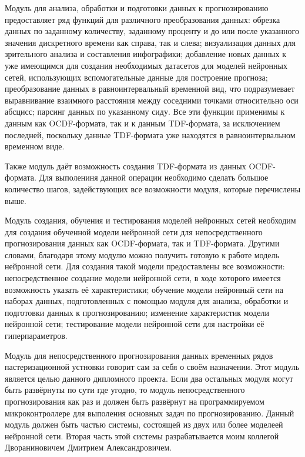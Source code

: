 {    \par \redline Модуль для анализа, обработки и подготовки данных к прогнозированию предоставляет ряд функций для различного преобразования данных: обрезка данных по заданному количеству, заданному проценту и до или после указанного значения дискретного времени как справа, так и слева; визуализация данных для зрительного анализа и составления инфографики; добавление новых данных к уже имеющимся для создания необходимых датасетов для моделей нейронных сетей, использующих вспомогательные данные для построение прогноза; преобразование данных в равноинтервальный временной вид, что подразумевает выравнивание взаимного расстояния между соседними точками относительно оси абсцисс; парсинг данных по указанному сиду. Все эти функции применимы к данным как OCDF-формата, так и к данным TDF-формата, за исключением последней, поскольку данные TDF-формата уже находятся в равноинтервальном временном виде.

    \par \redline Также модуль даёт возможность создания TDF-формата из данных OCDF-формата. Для выполениня данной операции необходимо сделать большое количество шагов, задействующих все возможности модуля, которые перечислены выше. 

    \par \redline Модуль создания, обучения и тестирования моделей нейронных сетей необходим для создания обученной модели нейронной сети для непосредственного прогнозирования данных как OCDF-формата, так и TDF-формата. Другими словами, благодаря этому модулю можно получить готовую к работе модель нейронной сети. Для создания такой модели предоставлены все возможности: непосредственное создание модели нейронной сети, в ходе которого имеется возможность указать её характеристики; обучение модели нейронный сети на наборах данных, подготовленных с помощью модуля для анализа, обработки и подготовки данных к прогнозированию; изменение характеристик модели нейронной сети; тестирование модели нейронной сети для настройки её гиперпараметров. 

    \par \redline Модуль для непосредственного прогнозирования данных временных рядов пастеризационной устновки говорит сам за себя о своём назначении. Этот модуль является целью данного дипломного проекта. Если два остальных модуля могут быть развёрнуты по сути где угодно, то модуль непосредственного прогнозирования как раз и должен быть развёрнут на программируемом микроконтроллере для выполения основных задач по прогнозированию. Данный модуль должен быть частью системы, состоящей из двух или более моделеей нейронной сети. Вторая часть этой системы разрабатывается моим коллегой Двораниновичем Дмитрием Александровичем. 

}
